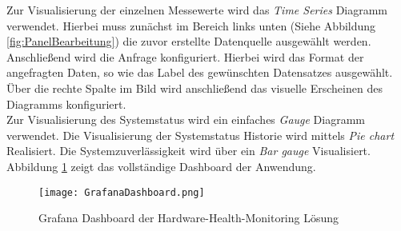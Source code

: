 \vspace{-1.8cm}
Zur Visualisierung der einzelnen Messewerte wird das \textit{Time Series} Diagramm verwendet. Hierbei muss zunächst im Bereich links unten (Siehe Abbildung \ref{fig:PanelBearbeitung}) die zuvor erstellte Datenquelle ausgewählt werden. Anschließend wird die Anfrage konfiguriert. Hierbei wird das Format der angefragten Daten, so wie das Label des gewünschten Datensatzes ausgewählt. Über die rechte Spalte im Bild wird anschließend das visuelle Erscheinen des Diagramms konfiguriert.\\
Zur Visualisierung des Systemstatus wird ein einfaches \textit{Gauge} Diagramm verwendet. Die Visualisierung der Systemstatus Historie wird mittels \textit{Pie chart} Realisiert. Die Systemzuverlässigkeit wird über ein \textit{Bar gauge} Visualisiert.\\
Abbildung \ref{fig:Grafa} zeigt das vollständige Dashboard der Anwendung.
\vspace{-2cm}
\begin{center}
    \begin{figure}[h!]
        \centering
        \texttt{[image: GrafanaDashboard.png]}
        \caption{Grafana Dashboard der Hardware-Health-Monitoring Lösung}
        \label{fig:Grafa}
    \end{figure}
\end{center}